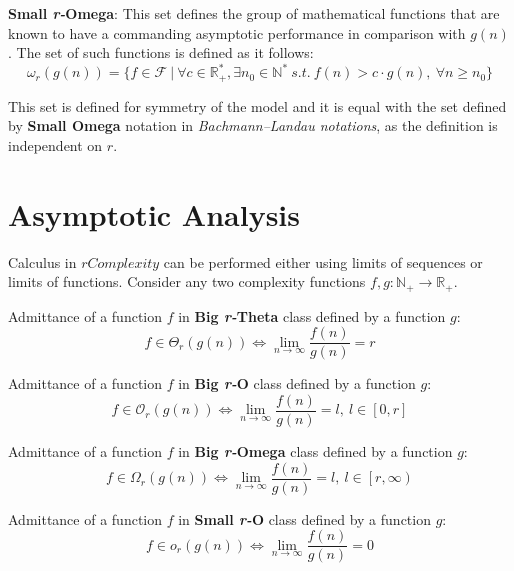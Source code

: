 \begin{definition} \textbf{Small \textit{r-}Omega}:
  This set defines the group of mathematical functions that are known to have a commanding asymptotic performance in comparison with  $g(n)$.
  The set of such functions is defined as it follows:
  \[\omega_{r}(g(n)) = \lbrace f \in \mathcal{F}\ |\ \forall c \in \mathbb{R}^{*}_{+}, \exists n_{0} \in \mathbb{N}^{*}\ s.t.\  f(n) > c \cdot g(n),\  \forall n \geq n_{0} \rbrace\]
\end{definition}
\begin{remark}
    This set is defined for symmetry of the model and it is equal with the set defined by \textbf{Small Omega} notation in \textit{Bachmann–Landau notations}, as the definition is independent on $r$.
\end{remark}

\section{Asymptotic Analysis}
Calculus in $rComplexity$ can be performed either using limits of sequences or limits of functions. Consider any two complexity functions $f,g:\mathbb{N}_{+}\longrightarrow\mathbb{R}_{+}$.

\begin{theorem} Admittance of a function $f$ in \textbf{Big \textit{r-}Theta} class defined by a function $g$: 
  \[ f \in \Theta_{r}(g(n)) \Leftrightarrow \lim_{n\to\infty} \dfrac{f(n)}{g(n)} = r \]
\end{theorem}   

\begin{theorem} Admittance of a function $f$ in \textbf{Big \textit{r-}O} class defined by a function $g$: 
    \[ f \in \mathcal{O}_{r}(g(n)) \Leftrightarrow \lim_{n\to\infty} \dfrac{f(n)}{g(n)} = l,\ l \in \left[ 0, r \right] \]
\end{theorem}   

\begin{theorem} Admittance of a function $f$ in \textbf{Big \textit{r-}Omega} class defined by a function $g$: 
      \[ f \in \Omega_{r}(g(n)) \Leftrightarrow \lim_{n\to\infty} \dfrac{f(n)}{g(n)} = l,\ l \in \left[ r, \infty \right) \]
\end{theorem}   

\begin{theorem} Admittance of a function $f$ in \textbf{Small \textit{r-}O} class defined by a function $g$:
    \[ f \in o_{r}(g(n)) \Leftrightarrow \lim_{n\to\infty} \dfrac{f(n)}{g(n)} = 0 \]
\end{theorem}   

